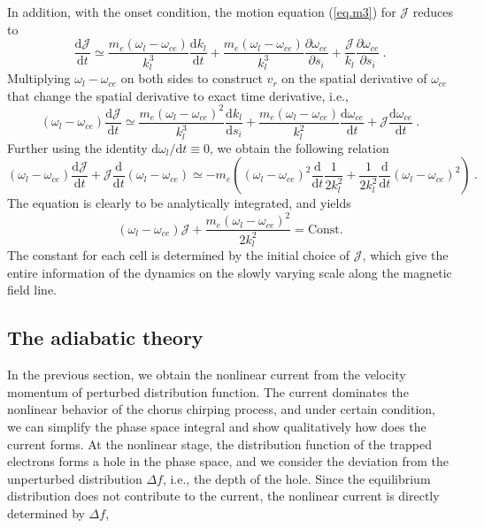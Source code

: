 In addition, with the onset condition, the motion equation (\ref{eq.m3}) for $\mathcal{J}$ reduces to
\begin{equation}
        \frac{\mathrm{d}\mathcal{J}}{\mathrm{d}t} \simeq  \frac{m_e(\omega_l - \omega_{ce})}{k_l^3} \frac{\mathrm{d} k_l}{\mathrm{d} t} + \frac{m_e(\omega_l - \omega_{ce})}{k_l^3} \frac{\partial \omega_{ce}}{\partial s_i}  +\frac{\mathcal{J}}{k_l}\frac{\partial \omega_{ce}}{\partial s_i}~.
\end{equation}
Multiplying $\omega_l - \omega_{ce}$ on both sides to construct $v_r$ on the spatial derivative of $\omega_{ce}$ that change the spatial derivative to exact time derivative, i.e., 
\begin{equation}
    (\omega_l - \omega_{ce}) \frac{\mathrm{d}\mathcal{J}}{\mathrm{d}t} \simeq  \frac{m_e(\omega_l - \omega_{ce})^2}{k_l^3} \frac{\mathrm{d} k_l}{\mathrm{d} s_i} + \frac{m_e(\omega_l - \omega_{ce})}{k_l^2} \frac{\mathrm{d} \omega_{ce}}{\mathrm{d} t} + \mathcal{J}\frac{\mathrm{d} \omega_{ce}}{\mathrm{d} t}~.
\end{equation}
Further using the identity $\mathrm{d}\omega_l/\mathrm{d}t \equiv 0$, we obtain the following relation
\begin{equation}
    (\omega_l - \omega_{ce}) \frac{\mathrm{d}\mathcal{J}}{\mathrm{d}t} + \mathcal{J}\frac{\mathrm{d}}{\mathrm{d} t}(\omega_l - \omega_{ce}) \simeq - m_e\left((\omega_l - \omega_{ce})^2 \frac{\mathrm{d}}{\mathrm{d} t}\frac{1}{2 k_l^2} + \frac{1}{2 k_l^2} \frac{\mathrm{d}}{\mathrm{d} t}(\omega_l - \omega_{ce})^2\right)~.
\end{equation}
The equation is clearly to be analytically integrated, and yields
\begin{equation}\label{eq.Jcons}
    (\omega_l - \omega_{ce})\mathcal{J} +  \frac{m_e(\omega_l - \omega_{ce})^2}{2k_l^2} = \mathrm{Const.}
\end{equation}
The constant for each cell is determined by the initial choice of $\mathcal{J}$, which give the entire information of the dynamics on the slowly varying scale along the magnetic field line.

\subsection{The adiabatic theory}
In the previous section, we obtain the nonlinear current from the velocity momentum of perturbed distribution function. 
The current dominates the nonlinear behavior of the chorus chirping process, and under certain condition, we can simplify the phase space integral and show qualitatively how does the current forms.
At the nonlinear stage, the distribution function of the trapped electrons forms a hole in the phase space, and we consider the deviation from the unperturbed distribution $\Delta f$, i.e., the depth of the hole.
Since the equilibrium distribution does not contribute to the current, the nonlinear current is directly determined by $\Delta f$, 

